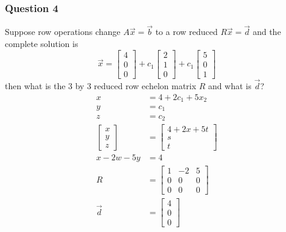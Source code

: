 \documentclass{math}
\begin{document}
\subsubsection*{Question 4}
Suppose row operations change \( A\vec{x} = \vec{b} \) to a row reduced
\( R\vec{x} = \vec{d} \) and the complete solution is
\[ \vec{x} = \begin{bmatrix}4 \\ 0 \\ 0\end{bmatrix}+
  c_1\begin{bmatrix}2 \\ 1 \\ 0\end{bmatrix}+
  c_1\begin{bmatrix}5 \\ 0 \\ 1\end{bmatrix} \]
then what is the 3 by 3 reduced row echelon matrix \( R \) and what is
\( \vec{d} \)?
\begin{align*}
  x &= 4+2c_1+5x_2 \\
  y &= c_1 \\
  z &= c_2 \\
  \begin{bmatrix}x \\ y \\ z\end{bmatrix} &= \begin{bmatrix}
    4+2x+5t \\ s \\ t
  \end{bmatrix} \\
  x-2w-5y &= 4 \\
  R &= \begin{bmatrix}
    1 & -2 & 5 \\
    0 & 0 & 0 \\
    0 & 0 & 0
  \end{bmatrix} \\
  \vec{d} &= \begin{bmatrix}4 \\ 0 \\ 0\end{bmatrix}
\end{align*}
\end{document}
